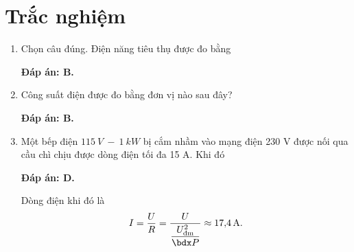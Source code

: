 \whiteBGstarBegin
\setcounter{section}{0}
\section{Trắc nghiệm}
\begin{enumerate}[label=\bfseries Câu \arabic*:]
	
	
	\item {}
	
	\cauhoi
	{Chọn câu đúng. Điện năng tiêu thụ được đo bằng
		
	}
	\loigiai
	{	\textbf{Đáp án: B.}
		
	}
	\item {}
	
	\cauhoi
	{Công suất điện được đo bằng đơn vị nào sau đây?
		
	}
	\loigiai
	{	\textbf{Đáp án: B.}
		
	}
	\item {}
	
	\cauhoi
	{Một bếp điện $\SI{115}{V}\ -\ \SI{1}{kW}$ bị cắm nhầm vào mạng điện 230 V được nối qua cầu chì chịu được dòng điện tối đa 15 A. Khi đó
		
	}
	\loigiai
	{	\textbf{Đáp án: D.}
		
		Dòng điện khi đó là
		$$I=\dfrac{U}{R} = \dfrac{U}{\dfrac{U_\text{đm}^2}{\calP}} \approx \SI{17.4}{A}.$$
		
}
\end{enumerate}
